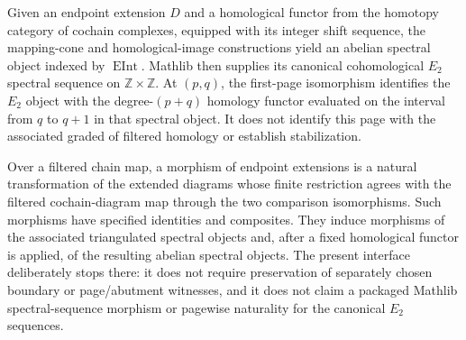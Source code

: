 \begin{definition}
  \label{def:filtered-complex-endpoint-e2-spectral-sequence}
  \leanok
  Given an endpoint extension $D$ and a homological functor from the homotopy
  category of cochain complexes, equipped with its integer shift sequence,
  the mapping-cone and homological-image constructions yield an abelian
  spectral object indexed by $\operatorname{EInt}$.  Mathlib then supplies
  its canonical cohomological $E_2$ spectral sequence on
  $\mathbb Z\times\mathbb Z$.  At $(p,q)$, the first-page
  isomorphism identifies the $E_2$ object with the degree-$(p+q)$ homology
  functor evaluated on the interval from $q$ to $q+1$ in that spectral object.
  It does not identify this page with the associated graded of filtered
  homology or establish stabilization.
\end{definition}

\begin{definition}
  \label{def:filtered-complex-endpoint-extension-morphism}
  \leanok
  Over a filtered chain map, a morphism of endpoint extensions is a natural
  transformation of the extended diagrams whose finite restriction agrees
  with the filtered cochain-diagram map through the two comparison
  isomorphisms.  Such morphisms have specified identities and composites.
  They induce morphisms of the associated triangulated spectral objects and,
  after a fixed homological functor is applied, of the resulting abelian
  spectral objects.  The present interface deliberately stops there: it does
  not require preservation of separately chosen boundary or page/abutment
  witnesses, and it does not claim a packaged Mathlib spectral-sequence
  morphism or pagewise naturality for the canonical $E_2$ sequences.
\end{definition}

